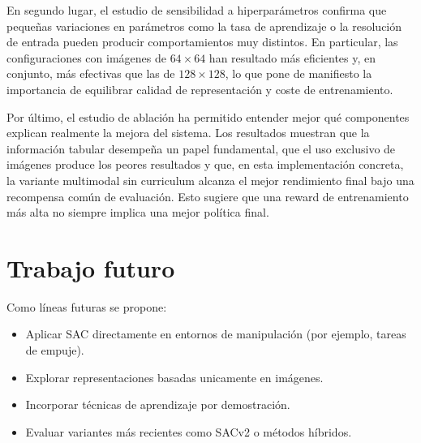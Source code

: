 \documentclass[10pt,twocolumn]{article}
\begin{document}
En segundo lugar, el estudio de sensibilidad a hiperparámetros confirma que pequeñas variaciones en parámetros como la tasa de aprendizaje o la resolución de entrada pueden producir comportamientos muy distintos. En particular, las configuraciones con imágenes de \(64\times64\) han resultado más eficientes y, en conjunto, más efectivas que las de \(128\times128\), lo que pone de manifiesto la importancia de equilibrar calidad de representación y coste de entrenamiento.

Por último, el estudio de ablación ha permitido entender mejor qué componentes explican realmente la mejora del sistema. Los resultados muestran que la información tabular desempeña un papel fundamental, que el uso exclusivo de imágenes produce los peores resultados y que, en esta implementación concreta, la variante multimodal sin curriculum alcanza el mejor rendimiento final bajo una recompensa común de evaluación. Esto sugiere que una reward de entrenamiento más alta no siempre implica una mejor política final.

\section*{Trabajo futuro}

Como líneas futuras se propone:
\begin{itemize}
    \item Aplicar SAC directamente en entornos de manipulación (por ejemplo, tareas de empuje).
    \item Explorar representaciones basadas unicamente en imágenes.
    \item Incorporar técnicas de aprendizaje por demostración.
    \item Evaluar variantes más recientes como SACv2 o métodos híbridos.
\end{itemize}
\end{document}
